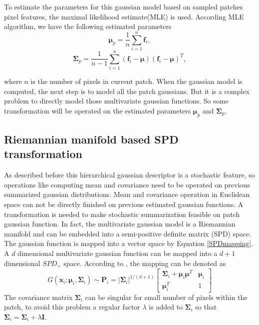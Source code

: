 To estimate the parameters for this gaussian model based on sampled patches pixel features, the maximal likelihood estimate(MLE) is used. According MLE algorithm, we have the following estimated parameters
\begin{equation}
\bm{\mu}_p = \frac{1}{n}\sum_{i = 1}^n \bm{f}_i,
\end{equation}
\begin{equation}
\bm{\Sigma}_p = \frac{1}{n-1} \sum_{i = 1}^n(\bm{f}_i-\bm{\mu})(\bm{f}_i-\bm{\mu})^T,
\end{equation}

where $n$ is the number of pixels in current patch. When the gaussian model is computed, the next step is to model all the patch gaussians. But it is a complex problem to directly model those multivariate gaussian functions. So some transformation will be operated on the estimated parameters $\bm{\mu}_p$ and $\bm{\Sigma}_p$.


\subsection{Riemannian manifold based SPD transformation}

As described before this hierarchical gaussian descriptor is a stochastic feature, so operations like computing mean and covariance need to be operated on previous summarized gaussian distributions. Mean and covariance operation in Euclidean space can not be directly finished on previous estimated gaussian functions. A transformation is needed to make stochastic summarization feasible on patch gaussian function.
In fact, the multivariate gaussian model is a Riemannian manifold and can be embedded into a semi-positive definite matrix (SPD) space. The gaussian function is mapped into a vector space by Equation \ref{SPDmapping}. A $d$ dimensional multivariate gaussian function can be mapped into a $d+1$ dimensional $SPD_+$ space. According to \cite{MultiVarGau}, the mapping can be denoted as 
\begin{equation}\label{SPDmapping}
G(\bm{x}_i;\bm{\mu}_i,\bm{\Sigma}_i) \sim \bm{P}_i  = |\bm{\Sigma}_i|^{1/(d+1)} \left[ \begin{matrix}
\bm{\Sigma}_i + \bm{\mu}_i\bm{\mu}^T & \bm{\mu}_i \\
\bm{\mu}_i^T & 1
\end{matrix}
\right]
\end{equation}
The covariance matrix $\bm{\Sigma}_i$ can be singular for small number of pixels within the patch, to avoid this problem a regular factor $\lambda$ is added to $\bm{\Sigma}_i$ so that $\bm{\Sigma}_i = \bm{\Sigma}_i + \lambda\bm{I}$. 

